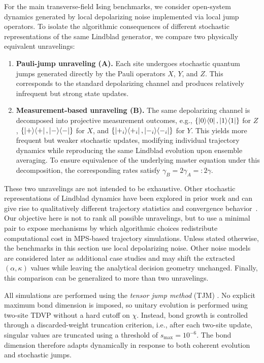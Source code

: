 \documentclass[aps, pra, superscriptaddress, reprint, floatfix]{revtex4-2}
\theoremstyle{plain}
\begin{document}
For the main transverse-field Ising benchmarks, we consider open-system dynamics generated by local depolarizing noise implemented via local jump operators. To isolate the algorithmic consequences of different stochastic representations of the same Lindblad generator, we compare two physically equivalent unravelings:
\begin{enumerate}
    \item \textbf{Pauli-jump unraveling (A).}  
    Each site undergoes stochastic quantum jumps generated directly by the Pauli operators $X$, $Y$, and $Z$. This corresponds to the standard depolarizing channel and produces relatively infrequent but strong state updates.

    \item \textbf{Measurement-based unraveling (B).}  
    The same depolarizing channel is decomposed into projective measurement outcomes, e.g., $\{\ket{0}\!\bra{0}, \ket{1}\!\bra{1}\}$ for $Z$, $\{\ket{+}\!\bra{+}, \ket{-}\!\bra{-}\}$ for $X$, and $\{\ket{+_i}\!\bra{+_i}, \ket{-_i}\!\bra{-_i}\}$ for $Y$. This yields more frequent but weaker stochastic updates, modifying individual trajectory dynamics while reproducing the same Lindblad evolution upon ensemble averaging. To ensure equivalence of the underlying master equation under this decomposition, the corresponding rates satisfy $\gamma_B = 2\gamma_A=:2\gamma$.
\end{enumerate}

These two unravelings are not intended to be exhaustive. Other stochastic representations of Lindblad dynamics have been explored in prior work and can give rise to qualitatively different trajectory statistics and convergence behavior~\cite{vovk_2022, vovk_2024, SimonSimulation, AnalogSimQuantinuum}. Our objective here is not to rank all possible unravelings, but to use a minimal pair to expose mechanisms by which algorithmic choices redistribute computational cost in MPS-based trajectory simulations. Unless stated otherwise, the benchmarks in this section use local depolarizing noise. Other noise models are considered later as additional case studies and may shift the extracted $(\alpha,\kappa)$ values while leaving the analytical decision geometry unchanged. Finally, this comparison can be generalized to more than two unravelings.

All simulations are performed using the \emph{tensor jump method} (TJM) \cite{sander_TJM_2025}. No explicit maximum bond dimension is imposed, so unitary evolution is performed using two-site TDVP without a hard cutoff on $\chi$. Instead, bond growth is controlled through a discarded-weight truncation criterion, i.e., after each two-site update, singular values are truncated using a threshold of $s_\text{max}=10^{-6}$. The bond dimension therefore adapts dynamically in response to both coherent evolution and stochastic jumps.
\end{document}
